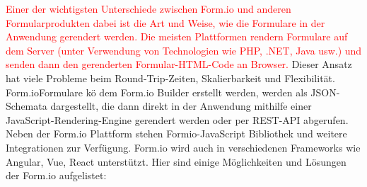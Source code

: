 \textcolor{red}{Einer der wichtigsten Unterschiede zwischen Form.io und anderen Formularprodukten dabei ist die Art und Weise, wie die Formulare in der Anwendung gerendert werden. Die meisten Plattformen rendern Formulare auf  dem Server (unter Verwendung von Technologien wie PHP, .NET, Java usw.) und senden dann den gerenderten Formular-HTML-Code an Browser.} Dieser Ansatz hat viele Probleme beim Round-Trip-Zeiten, Skalierbarkeit und Flexibilität. Form.ioFormulare kö dem Form.io Builder erstellt werden, werden als JSON-Schemata dargestellt, die dann direkt in der Anwendung mithilfe einer JavaScript-Rendering-Engine gerendert werden oder per REST-API abgerufen. Neben der Form.io Plattform stehen Formio-JavaScript Bibliothek und weitere Integrationen zur Verfügung. Form.io wird auch in verschiedenen Frameworks wie Angular, Vue, React unterstützt. Hier sind einige Möglichkeiten und Lösungen der Form.io aufgelistet:

